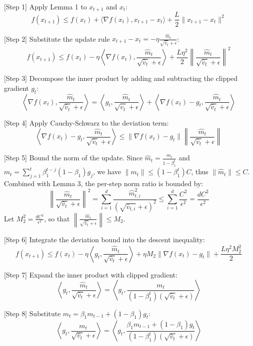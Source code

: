 \documentclass{article}
\begin{document}
[Step 1] Apply Lemma 1 to $x_{t+1}$ and $x_t$:
$$
f(x_{t+1}) \leq f(x_t) + \langle \nabla f(x_t), x_{t+1} - x_t \rangle + \frac{L}{2} \|x_{t+1} - x_t\|^2
$$

[Step 2] Substitute the update rule $x_{t+1} - x_t = -\eta \frac{\hat{m}_t}{\sqrt{\hat{v}_t} + \epsilon}$:
$$
f(x_{t+1}) \leq f(x_t) - \eta \left\langle \nabla f(x_t), \frac{\hat{m}_t}{\sqrt{\hat{v}_t} + \epsilon} \right\rangle + \frac{L \eta^2}{2} \left\| \frac{\hat{m}_t}{\sqrt{\hat{v}_t} + \epsilon} \right\|^2
$$

[Step 3] Decompose the inner product by adding and subtracting the clipped gradient $g_t$:
$$
\left\langle \nabla f(x_t), \frac{\hat{m}_t}{\sqrt{\hat{v}_t} + \epsilon} \right\rangle = \left\langle g_t, \frac{\hat{m}_t}{\sqrt{\hat{v}_t} + \epsilon} \right\rangle + \left\langle \nabla f(x_t) - g_t, \frac{\hat{m}_t}{\sqrt{\hat{v}_t} + \epsilon} \right\rangle
$$

[Step 4] Apply Cauchy-Schwarz to the deviation term:
$$
\left\langle \nabla f(x_t) - g_t, \frac{\hat{m}_t}{\sqrt{\hat{v}_t} + \epsilon} \right\rangle \leq \|\nabla f(x_t) - g_t\| \left\| \frac{\hat{m}_t}{\sqrt{\hat{v}_t} + \epsilon} \right\|
$$

[Step 5] Bound the norm of the update. Since $\hat{m}_t = \frac{m_t}{1-\beta_1^t}$ and $m_t = \sum_{j=1}^t \beta_1^{t-j} (1-\beta_1) g_j$, we have $\|m_t\| \leq (1-\beta_1^t) C$, thus $\|\hat{m}_t\| \leq C$. Combined with Lemma 3, the per-step norm ratio is bounded by:
$$
\left\| \frac{\hat{m}_t}{\sqrt{\hat{v}_t} + \epsilon} \right\|^2 = \sum_{i=1}^d \frac{\hat{m}_{t,i}^2}{(\sqrt{\hat{v}_{t,i}} + \epsilon)^2} \leq \sum_{i=1}^d \frac{C^2}{\epsilon^2} = \frac{d C^2}{\epsilon^2}
$$
Let $M_2^2 = \frac{d C^2}{\epsilon^2}$, so that $\left\| \frac{\hat{m}_t}{\sqrt{\hat{v}_t} + \epsilon} \right\| \leq M_2$.

[Step 6] Integrate the deviation bound into the descent inequality:
$$
f(x_{t+1}) \leq f(x_t) - \eta \left\langle g_t, \frac{\hat{m}_t}{\sqrt{\hat{v}_t} + \epsilon} \right\rangle + \eta M_2 \|\nabla f(x_t) - g_t\| + \frac{L \eta^2 M_2^2}{2}
$$

[Step 7] Expand the inner product with clipped gradient:
$$
\left\langle g_t, \frac{\hat{m}_t}{\sqrt{\hat{v}_t} + \epsilon} \right\rangle = \left\langle g_t, \frac{m_t}{(1-\beta_1^t)(\sqrt{\hat{v}_t} + \epsilon)} \right\rangle
$$

[Step 8] Substitute $m_t = \beta_1 m_{t-1} + (1-\beta_1) g_t$:
$$
\left\langle g_t, \frac{\hat{m}_t}{\sqrt{\hat{v}_t} + \epsilon} \right\rangle = \left\langle g_t, \frac{\beta_1 m_{t-1} + (1-\beta_1) g_t}{(1-\beta_1^t)(\sqrt{\hat{v}_t} + \epsilon)} \right\rangle
$$
\end{document}
